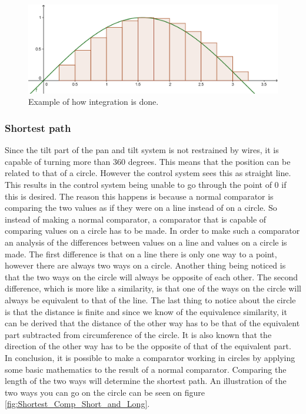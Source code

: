 \begin{figure}[h!]
\centering
\includegraphics[scale=0.4]{Billeder/FPGA/Integration_v1.png}
\caption{Example of how integration is done.}
\label{fig:Integration_v1}
\end{figure}


\subsubsection{Shortest path}

Since the tilt part of the pan and tilt system is not restrained by wires, it is capable of turning more than 360 degrees. This means that the position can be related to that of a circle. However the control system sees this as straight line. This results in the control system being unable to go through the point of 0 if this is desired. The reason this happens is because a normal comparator is comparing the two values as if they were on a line instead of on a circle. So instead of making a normal comparator, a comparator that is capable of comparing values on a circle has to be made.
In order to make such a comparator an analysis of the differences between values on a line and values on a circle is made. The first difference is that on a line there is only one way to a point, however there are always two ways on a circle. Another thing being noticed is that the two ways on the circle will always be opposite of each other.  The second difference, which is more like a similarity, is that one of the ways on the circle will always be equivalent to that of the line. The last thing to notice about the circle is that the distance is finite and since we know of the equivalence similarity, it can be derived that the distance of the other way has to be that of the equivalent part subtracted from circumference of the circle. It is also known that the direction of the other way has to be the opposite of that of the equivalent part. In conclusion, it is possible to make a comparator working in circles by applying some basic mathematics to the result of a normal comparator. Comparing the length of the two ways will determine the shortest path. An illustration of the two ways you can go on the circle can be seen on figure \ref{fig:Shortest_Comp_Short_and_Long}.


